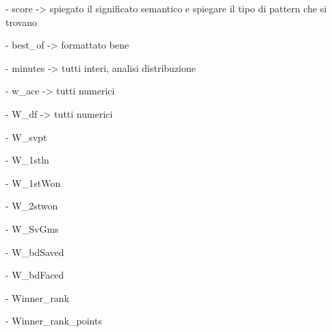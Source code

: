 \documentclass{article}
\begin{document}
- score -> spiegato il significato semantico e spiegare il tipo di pattern che si trovano

- best_of -> formattato bene

- minutes -> tutti interi, analisi distribuzione

- w_ace -> tutti numerici

- W_df -> tutti numerici

- W_svpt

- W_1stln

- W_1stWon

- W_2stwon

- W_SvGms

- W_bdSaved

- W_bdFaced

- Winner_rank

- Winner_rank_points
\end{document}
